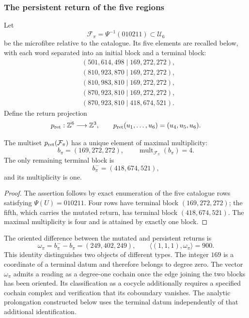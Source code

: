 \subsubsection{The persistent return of the five regions}

Let
\[
\mathcal F_\pi=\Psi^{-1}(010211)\subset\mathcal U_6
\]
be the microfibre relative to the catalogue. Its five elements are recalled
below, with each word separated into an initial block and a terminal block:
\[
\begin{aligned}
 &(501,614,498\mid169,272,272),\\
 &(810,923,870\mid169,272,272),\\
 &(810,983,810\mid169,272,272),\\
 &(870,923,810\mid169,272,272),\\
 &(870,923,810\mid418,674,521).
\end{aligned}
\]
Define the return projection
\[
p_{\rm ret}:\mathbb Z^6\longrightarrow\mathbb Z^3,
\qquad
p_{\rm ret}(u_1,\ldots,u_6)=(u_4,u_5,u_6).
\]

\begin{proposition}
\label{p12-83-c13-s3:prop:bloque-terminal-persistente}
The multiset \(p_{\rm ret}(\mathcal F_\pi)\) has a unique element of
maximal multiplicity:
\[
b_\pi=(169,272,272),
\qquad
\operatorname{mult}_{\mathcal F_\pi}(b_\pi)=4.
\]
The only remaining terminal block is
\[
b_\pi^-=(418,674,521),
\]
and its multiplicity is one.
\end{proposition}

\begin{proof}
The assertion follows by exact enumeration of the five catalogue rows
satisfying \(\Psi(U)=010211\). Four rows have terminal block
\((169,272,272)\); the fifth, which carries the mutated return, has terminal
block \((418,674,521)\). The maximal multiplicity is four and is attained
by exactly one block.
\end{proof}

The oriented difference between the mutated and persistent returns is
\[
 \omega_\pi=b_\pi^- - b_\pi=(249,402,249),
 \qquad
 \langle(1,1,1),\omega_\pi\rangle=900.
\]
This identity distinguishes two objects of different types. The integer
\(169\) is a coordinate of a terminal datum and therefore belongs to degree
zero. The vector \(\omega_\pi\) admits a reading as a degree-one cochain
once the edge joining the two blocks has been oriented. Its classification
as a cocycle additionally requires a specified cochain complex and
verification that its coboundary vanishes. The analytic prolongation
constructed below uses the terminal datum independently of that additional
identification.

